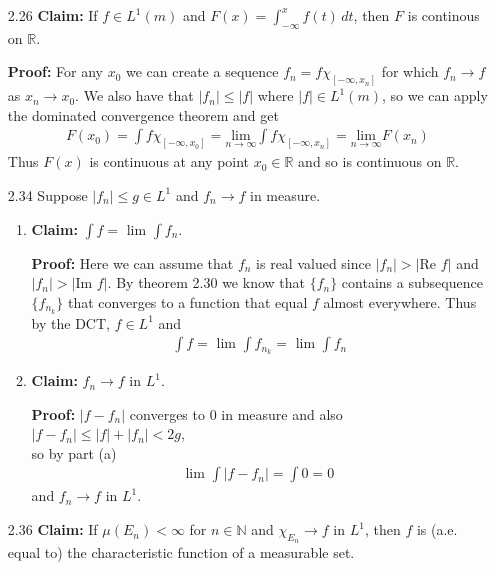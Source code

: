 \documentclass[11pt,letter]{article}
\begin{document}
\begin{enumerate}
    \item [2.26] \textbf{Claim:} If $f \in L^1(m)$ and $F(x) = \int_{-\infty}^x f(t)\,dt$, then $F$ is continous on $\mathbb{R}$.
    
    \textbf{Proof:} For any $x_0$ we can create a sequence $f_n = f\chi_{[-\infty, x_n]}$ for which $f_n \rightarrow f$ as $x_n \rightarrow x_0$. We also have that $|f_n| \le |f|$ where $|f| \in L^1(m)$, so we can apply the dominated convergence theorem and get
    \begin{align*}
        F(x_0) = \int f\chi_{[-\infty,x_0]} = \underset{n \rightarrow \infty}{\text{lim}} \int f\chi_{[-\infty,x_n]} = \underset{n \rightarrow \infty}{\text{lim}} F(x_n)
    \end{align*}
    Thus $F(x)$ is continuous at any point $x_0 \in \mathbb{R}$ and so is continuous on $\mathbb{R}$.

    \item [2.34] Suppose $|f_n| \le g \in L^1$ and $f_n \rightarrow f$ in measure.
    \begin{enumerate}
        \item \textbf{Claim:} $\int f = \text{ lim } \int f_n$.
        
        \textbf{Proof:} Here we can assume that $f_n$ is real valued since $|f_n| > |\text{Re }f|$ and $|f_n| > |\text{Im } f|$. By theorem 2.30 we know that $\{f_n\}$ contains a subsequence $\{f_{n_k}\}$ that converges to a function that equal $f$ almost everywhere. Thus by the DCT, $f \in L^1$ and
        \begin{align*}
            \int f = \text{ lim } \int f_{n_k} = \text{ lim } \int f_n
        \end{align*}

        \item \textbf{Claim:} $f_n \rightarrow f$ in $L^1$.
        
        \textbf{Proof:} $|f - f_n|$ converges to 0 in measure and also $|f - f_n| \le |f| + |f_n| < 2g$, \\so by part (a)
        \begin{align*}
            \text{lim } \int |f - f_n| = \int 0 = 0
        \end{align*}
        and $f_n \rightarrow f$ in $L^1$.
    \end{enumerate}

    \item [2.36] \textbf{Claim:} If $\mu(E_n) < \infty$ for $n \in \mathbb{N}$ and $\chi_{E_n} \rightarrow f$ in $L^1$, then $f$ is (a.e. equal to) the characteristic function of a measurable set.
    

\end{enumerate}
\end{document}
